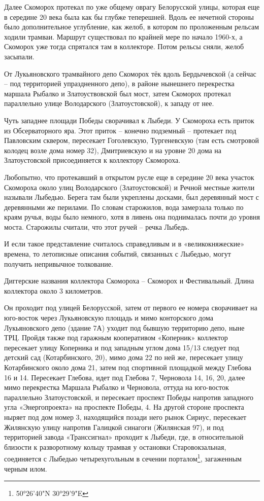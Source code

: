 Далее Скоморох протекал по уже общему оврагу Белорусской улицы, которая еще в середине 20 века была как бы глубже теперешней. Вдоль ее нечетной стороны было дополнительное углубление, как желоб, в котором по проложенным рельсам ходили трамваи. Маршрут существовал по крайней мере по начало 1960-х, а Скоморох уже тогда спрятался там в коллекторе. Потом рельсы сняли, желоб засыпали.

От Лукьяновского трамвайного депо Скоморох тёк вдоль Бердычевской (а сейчас – под территорией упраздненного депо), в районе нынешнего перекрестка маршала Рыбалко и Златоуствовской был мост, затем Скоморох протекал параллельно улице Володарского (Златоустовской), к западу от нее.

Чуть западнее площади Победы сворачивал к Лыбеди. У Скомороха есть приток из Обсерваторного яра. Этот приток – конечно подземный – протекает под Павловским сквером, пересекает Гоголевскую, Тургеневскую (там есть смотровой колодец возле дома номер 32), Дмитриевскую и на уровне 20 дома на Златоустовской присоединяется к коллектору Скомороха.

Любопытно, что протекавший в открытом русле еще в середине 20 века участок Скомороха около улиц Володарского (Златоустовской) и Речной местные жители называли Лыбедью. Берега там были укреплены досками, был деревянный мост с деревянными же перилами. По словам старожилов, вода замерзала только по краям ручья, воды было немного, хотя в ливень она поднималась почти до уровня моста. Старожилы считали, что этот ручей – речка Лыбедь. 

И если такое представление считалось справедливым и в «великокняжеские» времена, то летописные описания событий, связанных с Лыбедью, могут получить непривычное толкование.

Диггерские названия коллектора Скомороха – Скоморох и Фестивальный. Длина коллектора около 3 километров.

Он проходит под улицей Белорусской, затем от первого ее номера сворачивает на юго-восток через Лукьяновскую площадь и мимо конторского дома Лукьяновского депо (здание 7А) уходит под бывшую территорию депо, ныне ТРЦ. Пройдя также под гаражным кооперативом «Коперник» коллектор пересекает улицу Коперника и под западным углом дома 15/13 следует под детский сад (Котарбинского, 20), мимо дома 22 по ней же, пересекает улицу Котарбинского около дома 21, затем под спортивной площадкой между Глебова 16 и 14. Пересекает Глебова, идет под Глебова 7, Черновола 14, 16, 20, далее мимо перекрестка Маршала Рыбалко и Черновола, оттуда на юго-восток параллельно Златоустовской, и пересекает проспект Победы напротив западного угла «Энергопроекта» на проспекте Победы, 4. На другой стороне проспекта ныряет под дом номер 3, находящийся позади него рынок Сириус, пересекает Жилянскую улицу напротив Галицкой синагоги (Жилянская 97), и под территорией завода «Транссигнал» проходит к Лыбеди, где, в относительной близости к разворотному кольцу трамвая у остановки Старовокзальная, соединяется с Лыбедью четырехугольным в сечении порталом\footnote{50°26'40"N 30°29'9"E}, загаженным черным илом.\\

